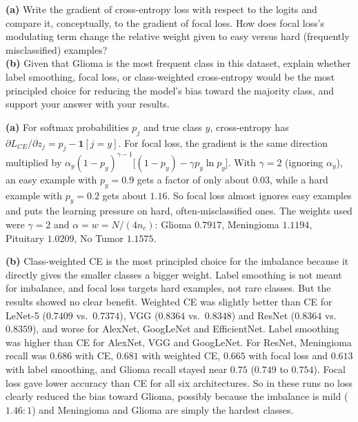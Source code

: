 \documentclass[12pt,a4paper]{article}
\begin{document}
\begin{tcolorbox}[colback=lightblue!40, colframe=myColorB, title={\textbf{6.1 --- Question}}, fonttitle=\small\bfseries, breakable]
\textbf{(a)} Write the gradient of cross-entropy loss with respect to the logits and
compare it, conceptually, to the gradient of focal loss. How does focal loss's
modulating term change the relative weight given to easy versus hard (frequently
misclassified) examples? \\[6pt]
\textbf{(b)} Given that Glioma is the most frequent class in this dataset, explain
whether label smoothing, focal loss, or class-weighted cross-entropy would be the most
principled choice for reducing the model's bias toward the majority class, and support
your answer with your results.
\end{tcolorbox}

\begin{answerbox}
\textbf{(a)} For softmax probabilities $p_j$ and true class $y$, cross-entropy has
$\partial L_{CE}/\partial z_j=p_j-\mathbf{1}[j=y]$. For focal loss, the gradient is the same direction multiplied
by $\alpha_y(1-p_y)^{\gamma-1}\big[(1-p_y)-\gamma p_y\ln p_y\big]$. With $\gamma=2$ (ignoring $\alpha_y$), an
easy example with $p_y=0.9$ gets a factor of only about $0.03$, while a hard example with $p_y=0.2$ gets about
$1.16$. So focal loss almost ignores easy examples and puts the learning pressure on hard,
often-misclassified ones. The weights used were $\gamma=2$ and $\alpha=w=N/(4n_c)$: Glioma $0.7917$,
Meningioma $1.1194$, Pituitary $1.0209$, No Tumor $1.1575$.\par
\textbf{(b)} Class-weighted CE is the most principled choice for the imbalance because it directly gives the
smaller classes a bigger weight. Label smoothing is not meant for imbalance, and focal loss targets hard
examples, not rare classes. But the results showed no clear benefit. Weighted CE was slightly better than CE for
LeNet-5 ($0.7409$ vs.\ $0.7374$), VGG ($0.8364$ vs.\ $0.8348$) and ResNet ($0.8364$ vs.\ $0.8359$), and worse for
AlexNet, GoogLeNet and EfficientNet. Label smoothing was higher than CE for AlexNet, VGG and GoogLeNet. For
ResNet, Meningioma recall was $0.686$ with CE, $0.681$ with weighted CE, $0.665$ with focal loss and $0.613$ with
label smoothing, and Glioma recall stayed near $0.75$ ($0.749$ to $0.754$). Focal loss gave lower accuracy than CE
for all six architectures. So in these runs no loss clearly reduced the bias toward Glioma, possibly because the
imbalance is mild ($1.46:1$) and Meningioma and Glioma are simply the hardest classes.
\end{answerbox}
\end{document}
